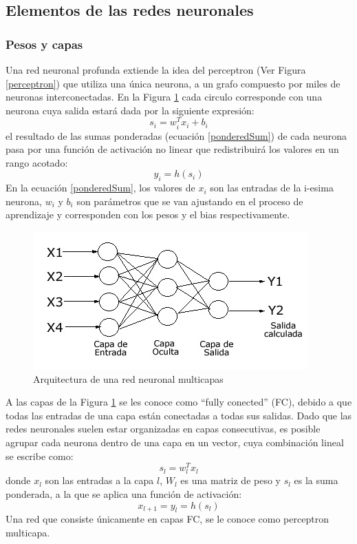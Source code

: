 \subsection{Elementos de las redes neuronales}
\subsubsection{Pesos y capas}
Una red neuronal profunda extiende la idea del perceptron (Ver Figura \ref{perceptron}) que utiliza una única neurona, a un grafo compuesto por miles de neuronas interconectadas. En la Figura \ref{NeuralNetworkArq} cada circulo corresponde con una neurona cuya salida estará dada por la siguiente expresión:
\begin{equation}
    s_{i} = w_{i}^{T} x_{i} + b_{i} \label{ponderedSum}
\end{equation}
el resultado de las sumas ponderadas (ecuación \ref{ponderedSum}) de cada neurona pasa por una función de activación no linear que redistribuirá los valores en un rango acotado:
\begin{equation}
    y_{i} = h(s_{i})
\end{equation}
En la ecuación \ref{ponderedSum}, los valores de $x_{i}$ son las entradas de la i-esima neurona, $w_{i}$ y $b_{i}$ son parámetros que se van ajustando en el proceso de aprendizaje y corresponden con los pesos y el bias respectivamente. 
\begin{figure}[H]
    \centering
    \includegraphics{Recursos/NeuralNetwork.jpg}
    \caption{Arquitectura de una red neuronal multicapas}
    \label{NeuralNetworkArq}
\end{figure}
A las capas de la Figura \ref{NeuralNetworkArq} se les conoce como ``fully conected'' (FC), debido a que todas las entradas de una capa están conectadas a todas sus salidas. Dado que las redes neuronales suelen estar organizadas en capas consecutivas, es posible agrupar cada neurona dentro de una capa en un vector, cuya combinación lineal se escribe como:
\begin{equation}
    s_{l} = w_{l}^{T} x_{l}
\end{equation}
donde $x_{l}$ son las entradas a la capa $l$, $W_{l}$ es una matriz de peso y $s_{l}$ es la suma ponderada, a la que se aplica una función de activación:
\begin{equation}
    x_{l+1} = y_{l} = h(s_{l})
\end{equation}
Una red que consiste únicamente en capas FC, se le conoce como perceptron multicapa. 

